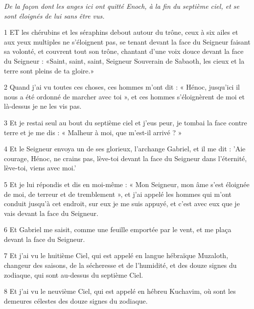 
\par \textit{De la façon dont les anges ici ont quitté Enoch, à la fin du septième ciel, et se sont éloignés de lui sans être vus.}

\par 1 ET les chérubins et les séraphins debout autour du trône, ceux à six ailes et aux yeux multiples ne s'éloignent pas, se tenant devant la face du Seigneur faisant sa volonté, et couvrent tout son trône, chantant d'une voix douce devant la face du Seigneur : «Saint, saint, saint, Seigneur Souverain de Sabaoth, les cieux et la terre sont pleins de ta gloire.»

\par 2 Quand j'ai vu toutes ces choses, ces hommes m'ont dit : « Hénoc, jusqu'ici il nous a été ordonné de marcher avec toi », et ces hommes s'éloignèrent de moi et là-dessus je ne les vis pas.

\par 3 Et je restai seul au bout du septième ciel et j'eus peur, je tombai la face contre terre et je me dis : « Malheur à moi, que m'est-il arrivé ? »

\par 4 Et le Seigneur envoya un de ses glorieux, l'archange Gabriel, et il me dit : 'Aie courage, Hénoc, ne crains pas, lève-toi devant la face du Seigneur dans l'éternité, lève-toi, viens avec moi.'

\par 5 Et je lui répondis et dis en moi-même : « Mon Seigneur, mon âme s'est éloignée de moi, de terreur et de tremblement », et j'ai appelé les hommes qui m'ont conduit jusqu'à cet endroit, sur eux je me suis appuyé, et c'est avec eux que je vais devant la face du Seigneur.

\par 6 Et Gabriel me saisit, comme une feuille emportée par le vent, et me plaça devant la face du Seigneur.

\par 7 Et j'ai vu le huitième Ciel, qui est appelé en langue hébraïque Muzaloth, changeur des saisons, de la sécheresse et de l'humidité, et des douze signes du zodiaque, qui sont au-dessus du septième Ciel.

\par 8 Et j'ai vu le neuvième Ciel, qui est appelé en hébreu Kuchavim, où sont les demeures célestes des douze signes du zodiaque.


